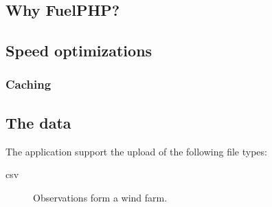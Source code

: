 \subsection{Why FuelPHP?}

\subsection{Speed optimizations}
\subsubsection{Caching}

\subsection{The data}
The application support the upload of the following file types:
\begin{description}
\item[csv] Observations form a wind farm. 
\end{description}